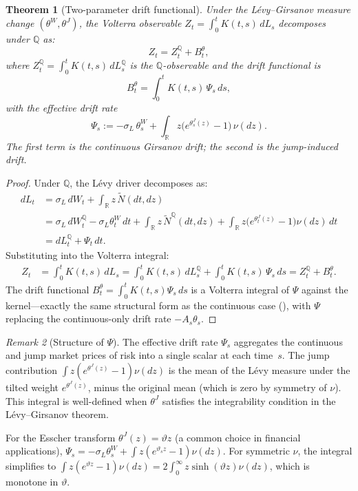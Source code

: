 \documentclass[11pt,a4paper]{article}
\theoremstyle{plain}
\newtheorem{theorem}{Theorem}[section]
\theoremstyle{definition}
\theoremstyle{remark}
\newtheorem{remark}[theorem]{Remark}
\newcommand{\R}{\mathbb{R}}
\newcommand{\QQ}{\mathbb{Q}}
\newcommand{\Ntilde}{\widetilde{N}}
\begin{document}
\begin{theorem}[Two-parameter drift functional]
\label{thm:drift-VL}
Under the L\'evy--Girsanov measure change $(\theta^W, \theta^J)$,
the Volterra observable $Z_t = \int_0^t K(t,s)\,dL_s$ decomposes
under $\QQ$ as:
\begin{equation}\label{eq:Z-decomp-VL}
  Z_t = Z_t^\QQ + B_t^\theta,
\end{equation}
where $Z_t^\QQ = \int_0^t K(t,s)\,dL_s^\QQ$ is the
$\QQ$-observable and the drift functional is
\begin{equation}\label{eq:drift-functional-VL}
  B_t^\theta
  = \int_0^t K(t,s)\,\Psi_s\,ds,
\end{equation}
with the \emph{effective drift rate}
\begin{equation}\label{eq:Psi-def}
  \Psi_s := -\sigma_L\,\theta_s^W
  + \int_\R z\bigl(e^{\theta_s^J(z)} - 1\bigr)\,\nu(dz).
\end{equation}
The first term is the continuous Girsanov drift; the second is
the jump-induced drift.
\end{theorem}

\begin{proof}
Under $\QQ$, the L\'evy driver decomposes as:
\begin{align*}
  dL_t &= \sigma_L\,dW_t + \int_\R z\,\Ntilde(dt,dz)\\
  &= \sigma_L\,dW_t^\QQ - \sigma_L\theta_t^W\,dt
  + \int_\R z\,\Ntilde^\QQ(dt,dz)
  + \int_\R z\bigl(e^{\theta_t^J(z)} - 1\bigr)\nu(dz)\,dt\\
  &= dL_t^\QQ + \Psi_t\,dt.
\end{align*}
Substituting into the Volterra integral:
\begin{align*}
  Z_t &= \int_0^t K(t,s)\,dL_s
  = \int_0^t K(t,s)\,dL_s^\QQ + \int_0^t K(t,s)\,\Psi_s\,ds
  = Z_t^\QQ + B_t^\theta.
\end{align*}
The drift functional $B_t^\theta = \int_0^t K(t,s)\Psi_s\,ds$ is a
Volterra integral of $\Psi$ against the kernel---exactly the same
structural form as the continuous case
(), with $\Psi$ replacing the
continuous-only drift rate $-A_s\theta_s$.
\end{proof}

\begin{remark}[Structure of $\Psi$]\label{rem:Psi-structure}
The effective drift rate $\Psi_s$ aggregates the continuous and jump
market prices of risk into a single scalar at each time~$s$.  The
jump contribution $\int z(e^{\theta^J(z)} - 1)\nu(dz)$ is the
mean of the L\'evy measure under the tilted weight
$e^{\theta^J(z)}$, minus the original mean (which is zero by
symmetry of $\nu$).  This integral is well-defined when
$\theta^J$ satisfies the integrability condition in the
L\'evy--Girsanov theorem.

For the Esscher transform $\theta^J(z) = \vartheta z$ (a common
choice in financial applications),
$\Psi_s = -\sigma_L\theta_s^W + \int z(e^{\vartheta_s z} - 1)\nu(dz)$.
For symmetric $\nu$, the integral simplifies to
$\int z(e^{\vartheta z} - 1)\nu(dz)
= 2\int_0^\infty z\sinh(\vartheta z)\nu(dz)$,
which is monotone in $\vartheta$.
\end{remark}
\end{document}
